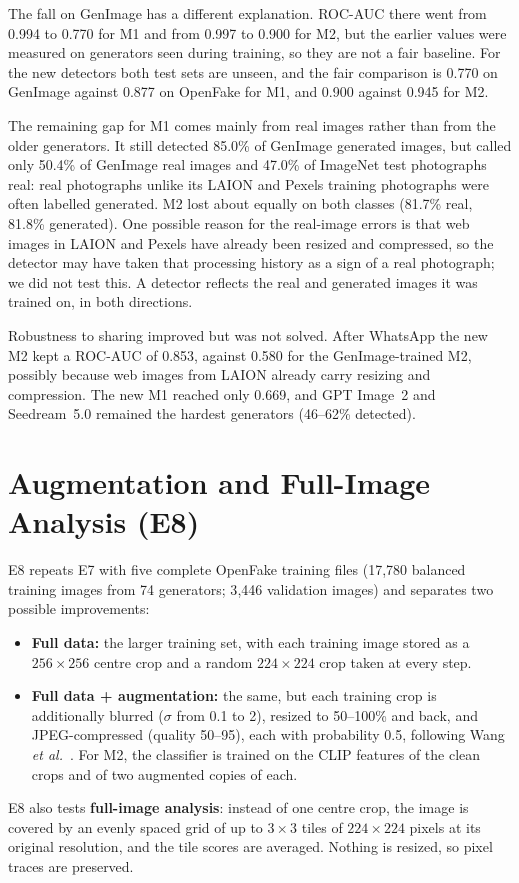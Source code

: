 \documentclass{mnnit}
\begin{document}
The fall on GenImage has a different explanation. \mbox{ROC-AUC} there went
from 0.994 to 0.770 for M1 and from 0.997 to 0.900 for M2, but the earlier
values were measured on generators seen during training, so they are not
a fair baseline. For the new detectors both test sets are unseen, and the
fair comparison is 0.770 on GenImage against 0.877 on OpenFake for M1, and
0.900 against 0.945 for M2.

The remaining gap for M1 comes mainly from real images rather than from
the older generators. It still detected 85.0\% of GenImage generated
images, but called only 50.4\% of GenImage real images and 47.0\% of
ImageNet test photographs real: real photographs unlike its LAION and
Pexels training photographs were often labelled generated. M2 lost about
equally on both classes (81.7\% real, 81.8\% generated). One possible
reason for the real-image errors is that web images in LAION and Pexels
have already been resized and compressed, so the detector may have taken
that processing history as a sign of a real photograph; we did not test
this. A detector reflects the real and generated images it was trained
on, in both directions.

Robustness to sharing improved but was not solved. After WhatsApp the new
M2 kept a \mbox{ROC-AUC} of 0.853, against 0.580 for the GenImage-trained M2,
possibly because web images from LAION already carry resizing and
compression. The new M1 reached only 0.669, and GPT Image~2 and
Seedream~5.0 remained the hardest generators (46--62\% detected).

\section{Augmentation and Full-Image Analysis (E8)}
\label{sec:e8}
E8 repeats E7 with five complete OpenFake training files (17{,}780
balanced training images from 74 generators; 3{,}446 validation
images) and separates two possible improvements:
\begin{itemize}
  \item \textbf{Full data:} the larger training set, with each training
        image stored as a $256\times256$ centre crop and a random
        $224\times224$ crop taken at every step.
  \item \textbf{Full data + augmentation:} the same, but each training
        crop is additionally blurred ($\sigma$ from 0.1 to 2), resized to
        50--100\% and back, and JPEG-compressed (quality 50--95), each
        with probability 0.5, following Wang \emph{et al.}~\cite{wang2020cnn}.
        For M2, the classifier is trained on the CLIP features of the
        clean crops and of two augmented copies of each.
\end{itemize}
E8 also tests \textbf{full-image analysis}: instead of one centre crop,
the image is covered by an evenly spaced grid of up to $3\times3$ tiles
of $224\times224$ pixels at its original resolution, and the tile scores
are averaged. Nothing is resized, so pixel traces are preserved.
\end{document}
